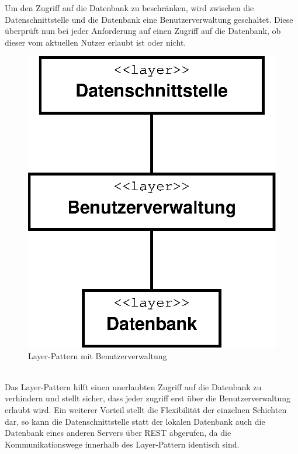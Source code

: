 Um den Zugriff auf die Datenbank zu beschränken, wird zwischen die Datenschnittstelle und die Datenbank eine Benutzerverwaltung geschaltet. Diese überprüft nun bei jeder Anforderung auf einen Zugriff auf die Datenbank, ob dieser vom aktuellen Nutzer erlaubt ist oder nicht.
\begin{figure}
	\vspace{-15pt}
\begin{center}
\includegraphics[width=1\linewidth]{Grafik/Diagramm/Layer}
\end{center}
\vspace{-15pt}
\caption[Layer-Klassen]{Layer-Pattern mit Benutzerverwaltung}
\label{fig:Layer}
\vspace{-70pt}
\end{figure}\\
Das Layer-Pattern hilft einen unerlaubten Zugriff auf die Datenbank zu verhindern und stellt sicher, dass jeder zugriff erst über die Benutzerverwaltung erlaubt wird. Ein weiterer Vorteil stellt die Flexibilität der einzelnen Schichten dar, so kann die Datenschnittstelle statt der lokalen Datenbank auch die Datenbank eines anderen Servers über REST abgerufen, da die Kommunikationswege innerhalb des Layer-Pattern identisch sind.
\vspace{60pt}